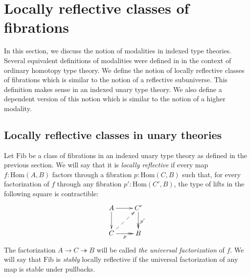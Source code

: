 \documentclass[reqno]{amsart}
\theoremstyle{definition}
\theoremstyle{remark}
\newcommand{\fs}[1]{\mathrm{#1}}
\newcommand{\Hom}{\fs{Hom}}
\newcommand{\Fib}{\fs{Fib}}
\numberwithin{figure}{section}
\begin{document}
\section{Locally reflective classes of fibrations}

In this section, we discuss the notion of modalities in indexed type theories.
Several equivalent definitions of modalities were defined in \cite{modality-hott} in the context of ordinary homotopy type theory.
We define the notion of locally reflective classes of fibrations which is similar to the notion of a reflective subuniverse.
This definition makes sense in an indexed unary type theory.
We also define a dependent version of this notion which is similar to the notion of a higher modality.

\subsection{Locally reflective classes in unary theories}

Let $\Fib$ be a class of fibrations in an indexed unary type theory as defined in the previous section.
We will say that it is \emph{locally reflective} if every map $f : \Hom(A,B)$ factors through a fibration $p : \Hom(C,B)$
such that, for every factorization of $f$ through any fibration $p' : \Hom(C',B)$, the type of lifts in the following square is contractible:
\[ \xymatrix{ A \ar[r] \ar[d]                   & C' \ar@{->>}[d]^{p'} \\
              C \ar@{->>}[r]_p \ar@{-->}[ur]    & B
            } \]
The factorization $A \to C \twoheadrightarrow B$ will be called \emph{the universal factorization} of $f$.
We will say that $\Fib$ is \emph{stably} locally reflective if the universal factorization of any map is stable under pullbacks.
\end{document}
